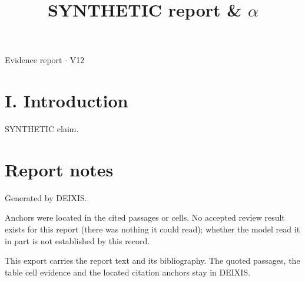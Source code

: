 \documentclass[journal]{IEEEtran}
\begin{document}
\title{SYNTHETIC report \& \ensuremath{\alpha}}

\maketitle

\noindent Evidence report \ensuremath{\cdot} V12

\section*{I. Introduction}

SYNTHETIC claim. \cite{Synth26}

\section*{Report notes}

Generated by DEIXIS.

Anchors were located in the cited passages or cells. No accepted review result exists for this report (there was nothing it could read); whether the model read it in part is not established by this record.

This export carries the report text and its bibliography. The quoted passages, the table cell evidence and the located citation anchors stay in DEIXIS.




\end{document}
